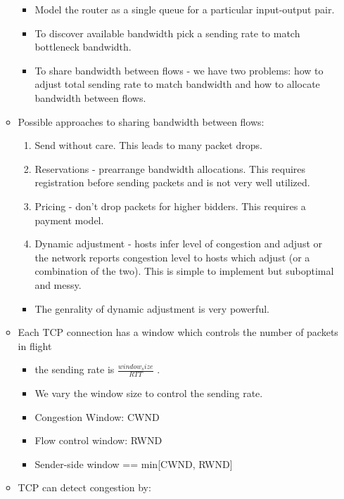 \documentclass[]{article}
\providecommand{\tightlist}{%
  \setlength{\itemsep}{0pt}\setlength{\parskip}{0pt}}
\begin{document}
\begin{itemize}
\begin{itemize}
    \begin{itemize}
    \tightlist
    \item
      Model the router as a single queue for a particular input-output
      pair.
    \item
      To discover available bandwidth pick a sending rate to match
      bottleneck bandwidth.
    \item
      To share bandwidth between flows - we have two problems: how to
      adjust total sending rate to match bandwidth and how to allocate
      bandwidth between flows.
    \end{itemize}
  \item
    Possible approaches to sharing bandwidth between flows:

    \begin{enumerate}
    \def\labelenumi{\arabic{enumi}.}
    \tightlist
    \item
      Send without care. This leads to many packet drops.
    \item
      Reservations - prearrange bandwidth allocations. This requires
      registration before sending packets and is not very well utilized.
    \item
      Pricing - don't drop packets for higher bidders. This requires a
      payment model.
    \item
      Dynamic adjustment - hosts infer level of congestion and adjust or
      the network reports congestion level to hosts which adjust (or a
      combination of the two). This is simple to implement but
      suboptimal and messy.
    \end{enumerate}

    \begin{itemize}
    \tightlist
    \item
      The genrality of dynamic adjustment is very powerful.
    \end{itemize}
  \item
    Each TCP connection has a window which controls the number of
    packets in flight

    \begin{itemize}
    \tightlist
    \item
      the sending rate is \(\frac{window_size}{RTT}\) .
    \item
      We vary the window size to control the sending rate.
    \item
      Congestion Window: CWND
    \item
      Flow control window: RWND
    \item
      Sender-side window == min{[}CWND, RWND{]}
    \end{itemize}
  \item
    TCP can detect congestion by:


\end{itemize}
\end{itemize}
\end{document}
